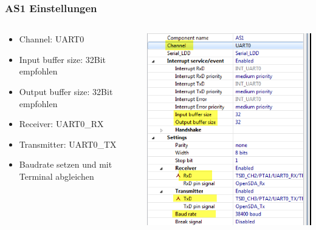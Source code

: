 \begin{frame}
  \frametitle{AS1 Einstellungen}
  	\begin{columns}
	    \begin{column}{0.45\linewidth}
	    	\begin{itemize}
	    	\item Channel: UART0
	    	\item Input buffer size: 32Bit empfohlen
	    	\item Output buffer size: 32Bit empfohlen
	    	\item Receiver: UART0\_RX
	    	\item Transmitter: UART0\_TX
	    	\item Baudrate setzen und mit Terminal abgleichen
	    	\end{itemize}
	    \end{column}
	    \begin{column}{0.45\linewidth}
	    	\begin{center}
	    		\includegraphics[width=1\textwidth]{images/CLS1_shell_2.png}
	    	\end{center}
	    \end{column}
	\end{columns}
\end{frame}

